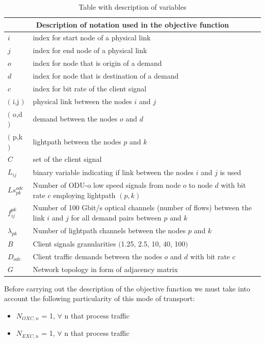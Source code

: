 \begin{table}[h!]
\centering
\begin{tabular}{ |p{1cm}||p{13cm}|}
 \hline
 \multicolumn{2}{|c|}{Description of notation used in the objective function} \\
 \hline
 \hline
 $i$ & index for start node of a physical link \\
 $j$ & index for end node of a physical link \\
 $o$ & index for node that is origin of a demand \\
 $d$ & index for node that is destination of a demand \\
 $c$ & index for bit rate of the client signal \\
 $($ i,j $)$ & physical link between the nodes $i$ and $j$ \\
 $($ o,d $)$ & demand between the nodes $o$ and $d$ \\
 $($ p,k $)$ & lightpath between the nodes $p$ and $k$ \\
 $C$ & set of the client signal \\
 $L_{ij}$ & binary variable indicating if link between the nodes $i$ and $j$ is used \\
 $Ls_{pk}^{odc}$ & Number of ODU-o low speed signals from node $o$ to node $d$ with bit rate $c$ employing lightpath $(p,k)$ \\
 $f_{ij}^{pk}$ & Number of 100 Gbit/s optical channels (number of flows) between the link $i$ and $j$ for all demand pairs between $p$ and $k$ \\
 $\lambda_{pk}$ & Number of lightpath channels between the nodes $p$ and $k$ \\
 $B$ & Client signals granularities $($1.25, 2.5, 10, 40, 100$)$ \\
 $D_{odc}$ & Client traffic demands between the nodes $o$ and $d$ with bit rate $c$ \\
 $G$ & Network topology in form of adjacency matrix \\
 \hline
\end{tabular}
\caption{Table with description of variables}
\label{description_transluc}
\end{table}

Before carrying out the description of the objective function we must take into account the following particularity of this mode of transport:
\begin{itemize}
  \item $N_{OXC,n}$ = 1, \quad $\forall$ n that process traffic
  \item $N_{EXC,n}$ = 1, \quad $\forall$ n that process traffic
\end{itemize}

